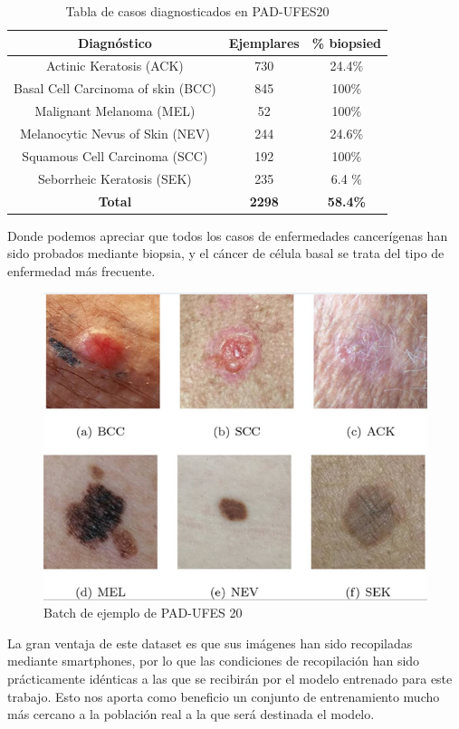 \begin{table}[!ht]
	\centering
	\begin{tabular}{|c|c|c|}
		\hline
		\textbf{Diagnóstico} & \textbf{Ejemplares} & \textbf{\% biopsied} \\ \hline
		Actinic Keratosis (ACK) & 730 & 24.4\% \\ \hline
		Basal Cell Carcinoma of skin (BCC) & 845 & 100\% \\ \hline
		Malignant Melanoma (MEL) & 52 & 100\% \\ \hline
		Melanocytic Nevus of Skin (NEV) & 244 & 24.6\% \\ \hline
		Squamous Cell Carcinoma (SCC) & 192 & 100\% \\ \hline
		Seborrheic Keratosis (SEK)	&235	&6.4 \% \\ \hline
		\textbf{Total} & \textbf{2298} & \textbf{58.4\%} \\ \hline
	\end{tabular}
	\caption{Tabla de casos diagnosticados en PAD-UFES20}
\end{table}

Donde podemos apreciar que todos los casos de enfermedades cancerígenas han sido probados mediante biopsia, y el cáncer de célula basal se trata del tipo de enfermedad más frecuente.
\begin{figure}[H]
	\centering
	\includegraphics[scale = 0.5]{imagenes/PAD-UFES.png}
	\caption{Batch de ejemplo de PAD-UFES 20 \cite{PACHECO2020106221}}
\end{figure}

La gran ventaja de este dataset es que sus imágenes han sido recopiladas mediante smartphones, por lo que las condiciones de recopilación han sido prácticamente idénticas a las que se recibirán por el modelo entrenado para este trabajo. Esto nos aporta como beneficio un conjunto de entrenamiento mucho más cercano a la población real a la que será destinada el modelo.

